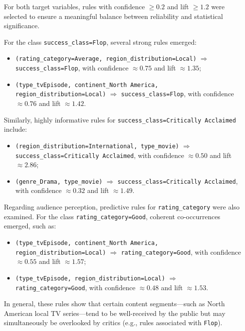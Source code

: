 \documentclass{article}
\begin{document}
For both target variables, rules with confidence $\geq 0.2$ and lift $\geq 1.2$ were selected to ensure a meaningful balance between reliability and statistical significance.

For the class \texttt{success\_class=Flop}, several strong rules emerged:
\begin{itemize}
    \item \texttt{(rating\_category=Average, region\_distribution=Local)} $\Rightarrow$ \texttt{success\_class=Flop}, with confidence $\approx 0.75$ and lift $\approx 1.35$;
    \item \texttt{(type\_tvEpisode, continent\_North America, region\_distribution=Local)} $\Rightarrow$ \texttt{success\_class=Flop}, with confidence $\approx 0.76$ and lift $\approx 1.42$.
\end{itemize}

Similarly, highly informative rules for \texttt{success\_class=Critically Acclaimed} include:
\begin{itemize}
    \item \texttt{(region\_distribution=International, type\_movie)} $\Rightarrow$ \texttt{success\_class=Critically Acclaimed}, with confidence $\approx 0.50$ and lift $\approx 2.86$;
    \item \texttt{(genre\_Drama, type\_movie)} $\Rightarrow$ \texttt{success\_class=Critically Acclaimed}, with confidence $\approx 0.32$ and lift $\approx 1.49$.
\end{itemize}

Regarding audience perception, predictive rules for \texttt{rating\_category} were also examined. For the class \texttt{rating\_category=Good}, coherent co-occurrences emerged, such as:
\begin{itemize}
    \item \texttt{(type\_tvEpisode, continent\_North America, region\_distribution=Local)} $\Rightarrow$ \texttt{rating\_category=Good}, with confidence $\approx 0.55$ and lift $\approx 1.57$;
    \item \texttt{(type\_tvEpisode, region\_distribution=Local)} $\Rightarrow$ \texttt{rating\_category=Good}, with confidence $\approx 0.48$ and lift $\approx 1.53$.
\end{itemize}

In general, these rules show that certain content segments—such as North American local TV series—tend to be well-received by the public but may simultaneously be overlooked by critics (e.g., rules associated with \texttt{Flop}).
\end{document}
